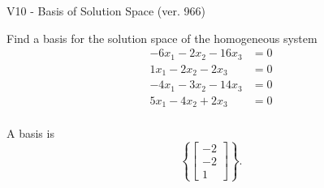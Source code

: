 \begin{exercise}
  \begin{exerciseTitle}V10 - Basis of Solution Space (ver. 966)\end{exerciseTitle}
  \begin{exerciseStatement}
    Find a basis for the solution space of the homogeneous system 
\begin{align*}
 -6 x_ 1 -2 x_ 2 -16 x_ 3 &= 0  \\ 
  1 x_ 1 -2 x_ 2 -2 x_ 3 &= 0  \\ 
  -4 x_ 1 -3 x_ 2 -14 x_ 3 &= 0  \\ 
  5 x_ 1 -4 x_ 2 + 2 x_ 3 &= 0  \\ 
 \end{align*}


 
  \end{exerciseStatement}

  \begin{exerciseAnswer}
   A basis is   
\[\left\{\left[\begin{array}{c}
-2 \\
-2 \\
1
\end{array}\right]\right\}.\]

  


  \end{exerciseAnswer}
\end{exercise}